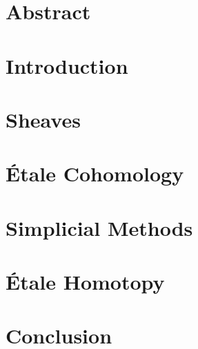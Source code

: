 \documentclass[11pt, openany]{memoir}
\theoremstyle{definition}
\begin{document}
  \nocite{*}

  \chapter*{Abstract}
  

  \begin{KeepFromToc} 
  \tableofcontents
  \end{KeepFromToc} 

  \chapter{Introduction}
  


  \chapter{Sheaves}
  

  \chapter{\'Etale Cohomology}
  
  

  \chapter{Simplicial Methods}
  


  \chapter{\'Etale Homotopy}

  \chapter{Conclusion}
  

  
  
\end{document}
